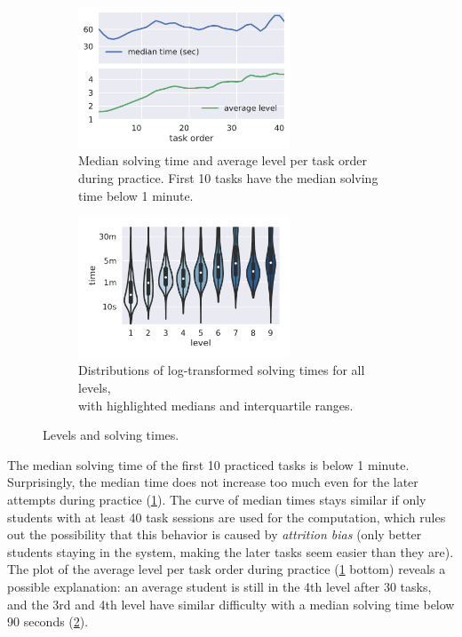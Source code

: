 \begin{figure}[htb]
\centering
\begin{subfigure}{.48\textwidth}
\centering
\includegraphics[height=42mm]{img/median-time-order}
\caption{Median solving time and average level per task order during practice.
  First 10 tasks have the median solving time below 1 minute.}
\label{fig:solving-times-per-order}
\end{subfigure}
\begin{subfigure}{.51\textwidth}
\centering
\includegraphics[height=42mm]{img/levels-time}
\caption{Distributions of log-transformed solving times for all levels,\\
         with highlighted medians and interquartile ranges.}
\label{fig:levels-time}
\end{subfigure}
\caption{Levels and solving times.}
\label{fig:solving-times}
\end{figure}


The median solving time of the first 10 practiced tasks is below 1 minute.
Surprisingly, the median time does not increase too much even for the later
attempts during practice (\cref{fig:solving-times-per-order}).
The curve of median times stays similar
if only students with at least 40 task sessions are used for the computation,
which rules out the possibility that this behavior is caused by \emph{attrition bias}
(only better students staying in the system, making the later tasks seem easier than they are).
The plot of the average level per task order during practice
(\cref{fig:solving-times-per-order} bottom) reveals a possible explanation:
an average student is still in the 4th level after 30 tasks,
and the 3rd and 4th level have similar difficulty with a median solving time below 90 seconds
(\cref{fig:levels-time}).



